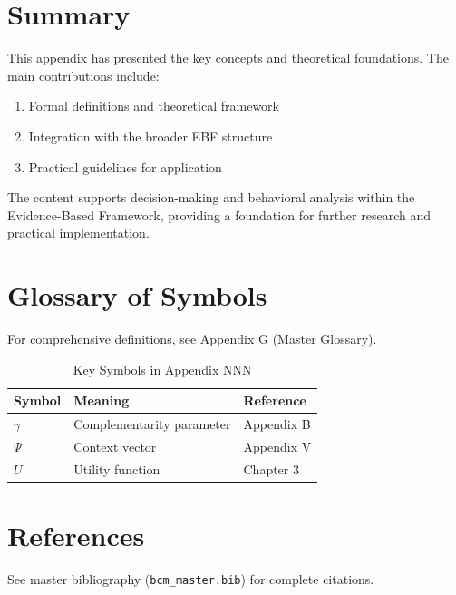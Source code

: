 \section{Summary}
\label{sec:nnn-summary}

This appendix has presented the key concepts and theoretical foundations.
The main contributions include:

\begin{enumerate}
    \item Formal definitions and theoretical framework
    \item Integration with the broader EBF structure
    \item Practical guidelines for application
\end{enumerate}

The content supports decision-making and behavioral analysis within the
Evidence-Based Framework, providing a foundation for further research
and practical implementation.


\section{Glossary of Symbols}
\label{sec:nnn-glossary}

For comprehensive definitions, see Appendix G (Master Glossary).

\begin{table}[htbp]
\centering
\caption{Key Symbols in Appendix NNN}
\begin{tabular}{lll}
\toprule
\textbf{Symbol} & \textbf{Meaning} & \textbf{Reference} \\
\midrule
$\gamma$ & Complementarity parameter & Appendix B \\
$\Psi$ & Context vector & Appendix V \\
$U$ & Utility function & Chapter 3 \\
\bottomrule
\end{tabular}
\end{table}


\section{References}
\label{sec:references}

See master bibliography (\texttt{bcm\_master.bib}) for complete citations.

